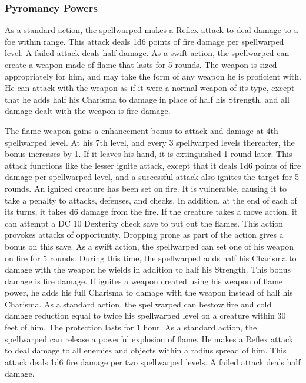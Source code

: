 \subsubsection{Pyromancy Powers}
 As a standard action, the spellwarped makes a Reflex attack to deal damage to a foe within \rngclose range. This attack deals 1d6 points of fire damage  per spellwarped level. A failed attack deals half damage.
 As a swift action, the spellwarped can create a weapon made of flame that lasts for 5 rounds. The weapon is sized appropriately for him, and may take the form of any weapon he is proficient with. He can attack with the weapon as if it were a normal weapon of its type, except that he adds half his Charisma to damage in place of half his Strength, and all damage dealt with the weapon is fire damage.
\par The flame weapon gains a  enhancement bonus to attack and damage at 4th spellwarped level. At his 7th level, and every 3 spellwarped levels thereafter, the bonus increases by 1. If it leaves his hand, it is extinguished 1 round later.
 This attack functions like the lesser ignite attack, except that it deals 1d6 points of fire damage per spellwarped level, and a successful attack also ignites the target for 5 rounds. An ignited creature has been set on fire. It is vulnerable, causing it to take a  penalty to attacks, defenses, and checks. In addition, at the end of each of its turns, it takes d6 damage from the fire. If the creature takes a move action, it can attempt a DC 10 Dexterity check save to put out the flames. This action provokes attacks of opportunity. Dropping prone as part of the action gives a  bonus on this save.
 As a swift action, the spellwarped can set one of his weapon on fire for 5 rounds. During this time, the spellwarped adds half his Charisma to damage with the weapon he wields in addition to half his Strength. This bonus damage is fire damage. If ignites a weapon created using his weapon of flame power, he adds his full Charisma to damage with the weapon instead of half his Charisma.
 As a standard action, the spellwarped can bestow fire and cold damage reduction equal to twice his spellwarped level on a creature within 30 feet of him. The protection lasts for 1 hour.
 As a standard action, the spellwarped can release a powerful explosion of flame. He makes a Reflex attack to deal damage to all enemies and objects within a \areamed radius spread of him. This attack deals 1d6 fire damage per two spellwarped levels. A failed attack deals half damage.
